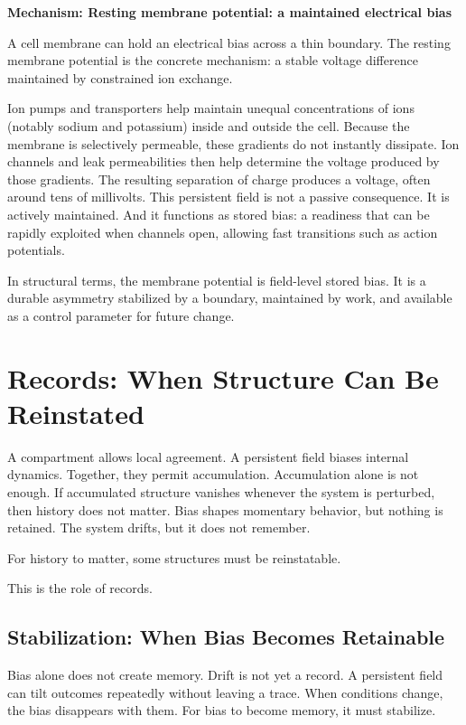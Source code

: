 \documentclass[11pt,twoside,openright]{book}
\newenvironment{mechanismbox}[1]
  {\begin{framed}\noindent\textbf{Mechanism: #1}\par\medskip}
  {\end{framed}}
\begin{document}
\begin{mechanismbox}{Resting membrane potential: a maintained electrical bias}
A cell membrane can hold an electrical bias across a thin boundary.
The resting membrane potential is the concrete mechanism: a stable voltage difference maintained by constrained ion exchange.

Ion pumps and transporters help maintain unequal concentrations of ions (notably sodium and potassium) inside and outside the cell. Because the membrane is selectively permeable, these gradients do not instantly dissipate. Ion channels and leak permeabilities then help determine the voltage produced by those gradients. The resulting separation of charge produces a voltage, often around tens of millivolts. This persistent field is not a passive consequence. It is actively maintained. And it functions as stored bias: a readiness that can be rapidly exploited when channels open, allowing fast transitions such as action potentials.

In structural terms, the membrane potential is field-level stored bias.
It is a durable asymmetry stabilized by a boundary, maintained by work, and available as a control parameter for future change.
\end{mechanismbox}

\chapter{Records: When Structure Can Be Reinstated}

A compartment allows local agreement. A persistent field biases internal dynamics. Together, they permit accumulation. Accumulation alone is not enough. If accumulated structure vanishes whenever the system is perturbed, then history does not matter. Bias shapes momentary behavior, but nothing is retained. The system drifts, but it does not remember.

For history to matter, some structures must be reinstatable.

This is the role of records.
\section*{Stabilization: When Bias Becomes Retainable}

Bias alone does not create memory. Drift is not yet a record. A persistent field can tilt outcomes repeatedly without leaving a trace. When conditions change, the bias disappears with them. For bias to become memory, it must stabilize.
\end{document}
